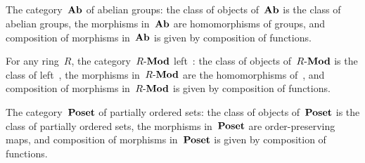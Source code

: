 \subsection{}

The category~$\mathbf{Ab}$ of abelian groups:
the class of objects of~$\mathbf{Ab}$ is the class of abelian groups, the morphisms in~$\mathbf{Ab}$ are homomorphisms of groups, and composition of morphisms in~$\mathbf{Ab}$ is given by composition of functions.

For any ring~$R$, the category~$R\text{-}\mathbf{Mod}$ left~:
the class of objects of~$R\text{-}\mathbf{Mod}$ is the class of left~, the morphisms in~$R\text{-}\mathbf{Mod}$ are the homomorphisms of~, and composition of morphisms in~$R\text{-}\mathbf{Mod}$ is given by composition of functions.

The category~$\mathbf{Poset}$ of partially ordered sets:
the class of objects of~$\mathbf{Poset}$ is the class of partially ordered sets, the morphisms in~$\mathbf{Poset}$ are order-preserving maps, and composition of morphisms in~$\mathbf{Poset}$ is given by composition of functions.
